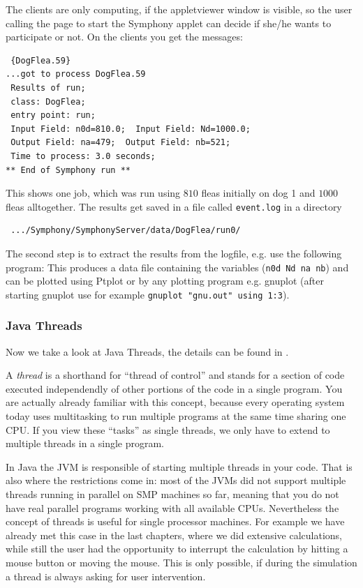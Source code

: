 The clients are only computing, if the appletviewer window is visible, so
the user calling the page to start the Symphony applet can decide if she/he
wants to participate or not. On the clients you get the messages:
\begin{small}
\begin{verbatim}
 {DogFlea.59} 
...got to process DogFlea.59
 Results of run; 
 class: DogFlea; 
 entry point: run;  
 Input Field: n0d=810.0;  Input Field: Nd=1000.0; 
 Output Field: na=479;  Output Field: nb=521; 
 Time to process: 3.0 seconds;  
** End of Symphony run **   
\end{verbatim} 
\end{small}
This shows one job, which was run using $810$ fleas initially on dog 1 and
$1000$ fleas alltogether. The results get saved in a file called \verb|event.log|
in a directory 
\begin{verbatim}
 .../Symphony/SymphonyServer/data/DogFlea/run0/ 
\end{verbatim}
The second step is to extract the results from the logfile, e.g. use the
following program:
This produces a data file containing the variables (\verb|n0d Nd na nb|) 
and can be plotted using Ptplot or by any plotting program e.g. gnuplot (after 
starting gnuplot use for example \verb|gnuplot "gnu.out" using 1:3|).


\subsubsection{Java Threads}
Now we take a look at Java Threads, the details can be found in
\cite[]{JavaThreads}. 

A \emph{thread} is a shorthand for ``thread of control'' and stands for a
section of code executed independendly of other portions of the code
 in a single program.
You are actually already familiar with this concept, because every operating
system today uses multitasking to run multiple programs at the same time sharing
one CPU. If you view these ``tasks'' as single threads, we only have to
extend to multiple threads in a single program. 

In Java the JVM is responsible
of starting multiple threads in your code. That is also where the restrictions
come in: most of the JVMs did not support multiple threads running in
parallel on SMP machines so far, meaning that you do not have real parallel 
programs working with all available CPUs. Nevertheless the concept
of threads is useful for single processor machines. For example we have 
already met this case in the last chapters, where we did extensive
calculations, while still the user had the opportunity to interrupt the 
calculation by hitting a mouse button or moving the mouse. This is only
possible, if during the simulation a thread is always asking for user 
intervention. 

